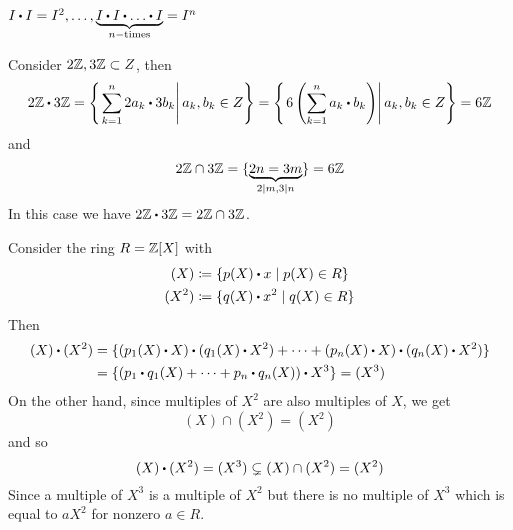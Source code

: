 \documentclass[../Main.tex]{subfiles}
\begin{document}
\Note $I\rdot I=I^2, \dots, \underbrace{I\rdot I\rdot \dots \rdot I}_{n-\text{times}}=I^n$
\begin{example}
	Consider $2\mathbb{Z}, 3\mathbb{Z} \subset Z$, then
	\[2\Z\rdot 3\Z = \left\{ \left. \sum_{k=1}^n 2a_k\rdot 3b_k\right| a_k,b_k\in Z\right\} = \left\{ \left.6\left(\sum_{k=1}^n a_k\rdot b_k\right)\right| a_k,b_k\in Z\right\}=6\Z\]
	and
	\[2\mathbb{Z}\cap 3\mathbb{Z} = \{\underbrace{2n=3m}_{2|m,3|n}\}=6\mathbb{Z}\]
In this case we have $2\Z\rdot 3\Z=2\Z\cap 3\Z$.
\end{example}
\newpage
\begin{example}
	Consider the ring $R=\mathbb{Z}[X]$ with
	\begin{align*}
	(X)&\coloneqq\{p(X)\rdot x\mid p(X)\in R\}\\
	(X^2)&\coloneqq \{q(X)\rdot x^2\mid q(X)\in R\}
	\end{align*}
	Then
	\begin{align*}
	(X)\rdot (X^2)&=\{(p_1(X)\rdot X)\rdot (q_1(X)\rdot X^2)+\dots+(p_n(X)\rdot X)\rdot (q_n(X)\rdot X^2)\}\\ &= \{(p_1\rdot q_1(X)+\dots+p_n\rdot q_n(X))\rdot X^3\}=(X^3)
	\end{align*}
	On the other hand, since multiples of $X^2$ are also multiples of $X$, we get
	\[(X)\cap(X^2) = (X^2)\]
	and so
	\[(X)\rdot (X^2)=(X^3)\subsetneq(X)\cap(X^2)=(X^2)\]
	Since a multiple of $X^3$ is a multiple of $X^2$ but there is no multiple of $X^3$ which is equal to $aX^2$ for nonzero $a \in R$.
\end{example}
\end{document}
